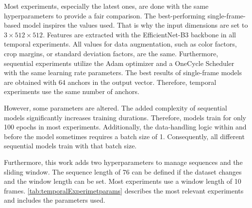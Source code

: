 Most experiments, especially the latest ones, are done with the same hyperparameters to provide a fair comparison.
The best-performing single-frame-based model inspires the values used.
That is why the input dimensions are set to $3 \times 512 \times 512$.
Features are extracted with the EfficientNet-B3 backbone in all temporal experiments.
All values for data augmentation, such as color factors, crop margins, or standard deviation factors, are the same.
Furthermore, sequential experiments utilize the Adam optimizer \cite{pytorchAdamOptimizer} and a OneCycle Scheduler \cite{pytorch_oneCycleLR_docu} with the same learning rate parameters.
The best results of single-frame models are obtained with 64 anchors in the output vector.
Therefore, temporal experiments use the same number of anchors.

However, some parameters are altered.
The added complexity of sequential models significantly increases training durations.
Therefore, models train for only 100 epochs in most experiments.
Additionally, the data-handling logic within and before the model sometimes requires a batch size of 1.
Consequently, all different sequential models train with that batch size.

Furthermore, this work adds two hyperparameters to manage sequences and the sliding window.
The sequence length of 76 can be defined if the dataset changes and the window length can be set.
Most experiments use a window length of 10 frames.
\autoref{tab:temporalExperimetparams} describes the most relevant experiments and includes the parameters used.

\vspace{1cm}

